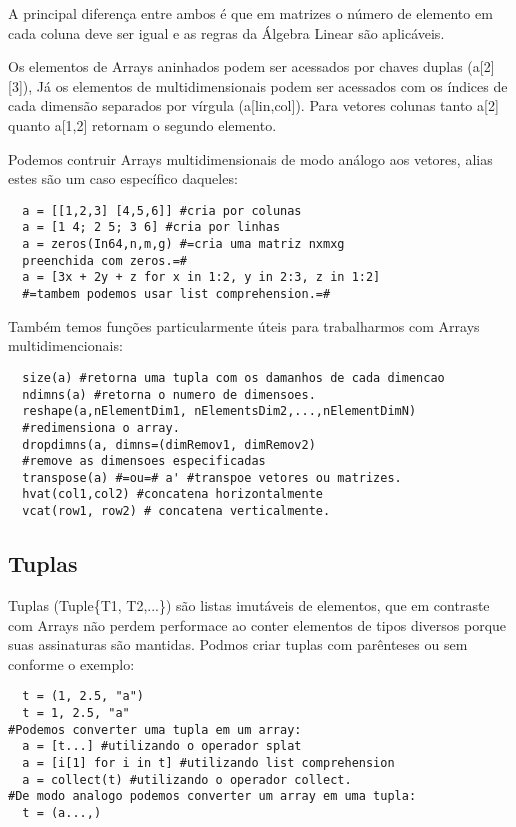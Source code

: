 A principal diferença entre ambos é que em matrizes o número de elemento em cada coluna deve ser igual e as regras da Álgebra Linear são aplicáveis. 


Os elementos de Arrays aninhados podem ser acessados por chaves duplas (a[2][3]), Já os elementos de multidimensionais podem ser acessados com os índices de cada dimensão separados por vírgula (a[lin,col]). Para vetores colunas tanto a[2] quanto a[1,2] retornam o segundo elemento. 

Podemos contruir Arrays multidimensionais de modo análogo aos vetores, alias estes são um caso específico daqueles:
\begin{lstlisting}
  a = [[1,2,3] [4,5,6]] #cria por colunas
  a = [1 4; 2 5; 3 6] #cria por linhas
  a = zeros(In64,n,m,g) #=cria uma matriz nxmxg 
  preenchida com zeros.=#
  a = [3x + 2y + z for x in 1:2, y in 2:3, z in 1:2] 
  #=tambem podemos usar list comprehension.=#
\end{lstlisting}

Também temos funções particularmente úteis para trabalharmos com Arrays multidimencionais:
\begin{lstlisting}
  size(a) #retorna uma tupla com os damanhos de cada dimencao
  ndimns(a) #retorna o numero de dimensoes.
  reshape(a,nElementDim1, nElementsDim2,...,nElementDimN) 
  #redimensiona o array.
  dropdimns(a, dimns=(dimRemov1, dimRemov2) 
  #remove as dimensoes especificadas
  transpose(a) #=ou=# a' #transpoe vetores ou matrizes.
  hvat(col1,col2) #concatena horizontalmente
  vcat(row1, row2) # concatena verticalmente. 
\end{lstlisting}

\subsection{Tuplas}
Tuplas (Tuple\{T1, T2,...\}) são listas imutáveis de elementos, que em contraste com Arrays não perdem performace ao conter elementos de tipos diversos porque suas assinaturas são mantidas. Podmos criar tuplas com parênteses ou sem conforme o exemplo:
\begin{lstlisting}
  t = (1, 2.5, "a")
  t = 1, 2.5, "a"
#Podemos converter uma tupla em um array:
  a = [t...] #utilizando o operador splat
  a = [i[1] for i in t] #utilizando list comprehension
  a = collect(t) #utilizando o operador collect. 
#De modo analogo podemos converter um array em uma tupla:
  t = (a...,)
\end{lstlisting}  

